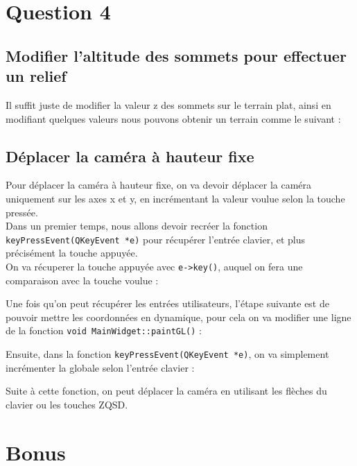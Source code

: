 \documentclass[a4paper,11pt]{report}
\begin{document}
	\section{Question 4}
	\subsection{Modifier l'altitude des sommets pour effectuer un relief}
	Il suffit juste de modifier la valeur z des sommets sur le terrain plat, ainsi en modifiant quelques valeurs nous pouvons obtenir un terrain comme le suivant :
	
	\subsection{Déplacer la caméra à hauteur fixe}
	Pour déplacer la caméra à hauteur fixe, on va devoir déplacer la caméra uniquement sur les axes x et y, en incrémentant la valeur voulue selon la touche pressée.\\
	Dans un premier temps, nous allons devoir recréer la fonction \lstinline{keyPressEvent(QKeyEvent *e)} pour récupérer l'entrée clavier, et plus précisément la touche appuyée.\\
	On va récuperer la touche appuyée avec \lstinline{e->key()}, auquel on fera une comparaison avec la touche voulue :
	
	
	\pagebreak
	
	Une fois qu'on peut récupérer les entrées utilisateurs, l'étape suivante est de pouvoir mettre les coordonnées en dynamique, pour cela on va modifier une ligne de la fonction \lstinline{void MainWidget::paintGL()} :
	
	Ensuite, dans la fonction \lstinline{keyPressEvent(QKeyEvent *e)}, on va simplement incrémenter la globale selon l'entrée clavier :
	
	Suite à cette fonction, on peut déplacer la caméra en utilisant les flèches du clavier ou les touches ZQSD.
	
	\pagebreak
	\section{Bonus}
    	
\end{document}
